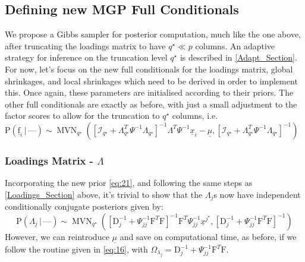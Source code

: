 \documentclass[a4paper,12pt,fleqn]{article}
\numberwithin{equation}{section}
\def\given{\,|\,}
\begin{document}
\subsection[Defining new MGP Full Conditionals]{Defining new MGP Full Conditionals}
We propose a Gibbs sampler for posterior computation, much like the one above, after truncating the loadings matrix to have $q^\star \ll p$ columns. An adaptive strategy for inference on the truncation level $q^\star$ is described in \ref{Adapt_Section}. For now, let's focus on the new full conditionals for the loadings matrix, global shrinkages, and local shrinkages which need to be derived in order to implement this. Once again, these parameters are initialised according to their priors. The other full conditionals are exactly as before, with just a small adjustment to the factor scores to allow for the truncation to $q^\star$ columns, i.e. $\mathrm{P}\left(\underline{\text{f}}_i \given \mbox{---}\right) \sim  \operatorname{MVN}_{q^\star}\left(\left[\mathcal{I}_{q^\star} + \Lambda^T_{q^\star}\Psi^{-1}\Lambda_{q^\star}\right]^{-1}\Lambda^T\Psi^{-1}\underline{x}_i - \underline{\mu},\left[\mathcal{I}_{q^\star} + \Lambda^T_{q^\star}\Psi^{-1}\Lambda_{q^\star}\right]^{-1}\right)$

\subsubsection[Loadings Matrix]{Loadings Matrix - $\Lambda$}
Incorporating the new prior \eqref{eq:21}, and following the same steps as \ref{Loadings_Section} above, it's trivial to show that the $\Lambda_j$s now have independent conditionally conjugate posteriors given by$\colon$
\begin{equation}
\mathrm{P}\left(\Lambda_j\given \mbox{---}\right) \sim \operatorname{MVN}_{q^\star}\left(\left[\mathrm{D}_j^{-1} + \Psi_{jj}^{-1}\text{F}^T\text{F}\right]^{-1}\text{F}^T\Psi_{jj}^{-1}\underline{x}^{j^\star},\left[\mathrm{D}_j^{-1} + \Psi_{jj}^{-1}\text{F}^T\text{F}\right]^{-1}\right)\label{eq:24}\end{equation}
\noindent However, we can reintroduce $\underline{\mu}$ and save on computational time, as before, if we follow the routine given in \eqref{eq:16}, with $\Omega_{\lambda_j} = \mathrm{D}_j^{-1} + \Psi_{jj}^{-1}\text{F}^T\text{F}$.
\end{document}
